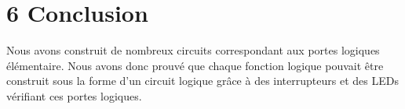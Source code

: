 \documentclass{report}
\begin{document}
\section*{6 Conclusion}
\hspace*{1,5cm} Nous avons  construit de nombreux circuits correspondant aux portes logiques \'el\'ementaire. Nous avons donc prouv\'e que chaque fonction logique pouvait \^etre construit sous la forme d'un circuit logique gr\^ace \`a des interrupteurs et des LEDs vérifiant ces portes logiques.\\
\end{document}
